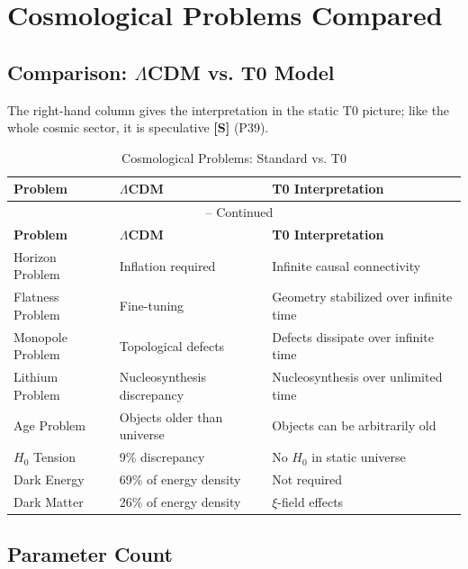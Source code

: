 	\section{Cosmological Problems Compared}
	
	\subsection{Comparison: $\Lambda$CDM vs. T0 Model}
	
	The right-hand column gives the interpretation in the static T0 picture; like the whole cosmic sector, it is speculative \textbf{[S]} (P39).
	
	\begin{longtable}{p{3.2cm}p{3.6cm}p{3.6cm}}
		\caption{Cosmological Problems: Standard vs. T0} \\
		\toprule
		\textbf{Problem} & \textbf{$\Lambda$CDM} & \textbf{T0 Interpretation} \\
		\midrule
		\endfirsthead
		\multicolumn{3}{c}{\tablename\ \thetable{} -- Continued} \\
		\toprule
		\textbf{Problem} & \textbf{$\Lambda$CDM} & \textbf{T0 Interpretation} \\
		\midrule
		\endhead
		Horizon Problem & Inflation required & Infinite causal connectivity \\
		Flatness Problem & Fine-tuning & Geometry stabilized over infinite time \\
		Monopole Problem & Topological defects & Defects dissipate over infinite time \\
		Lithium Problem & Nucleosynthesis discrepancy & Nucleosynthesis over unlimited time \\
		Age Problem & Objects older than universe & Objects can be arbitrarily old \\
		$H_0$ Tension & 9\% discrepancy & No $H_0$ in static universe \\
		Dark Energy & 69\% of energy density & Not required \\
		Dark Matter & 26\% of energy density & $\xi$-field effects \\
		\bottomrule
	\end{longtable}
\normalsize
	
	\subsection{Parameter Count}
	
